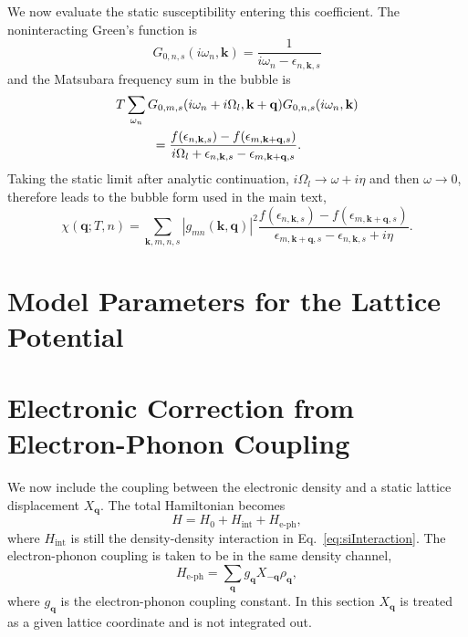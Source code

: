 \documentclass[aps,prx,article,twocolumn,amsmath,amssymb,superscriptaddress,longbibliography]{revtex4-2}
\begin{document}
We now evaluate the static susceptibility entering this coefficient.
The noninteracting Green's function is
\begin{equation}
G_{0,n,s}(i\omega_n,\mathbf k)
=
\frac{1}{i\omega_n-\epsilon_{n,\mathbf k,s}}
\end{equation}
and the Matsubara frequency sum in the bubble is
\begin{align}
&T
\sum_{\omega_n}
G_{0,m,s}(i\omega_n+i\Omega_l,\mathbf k+\mathbf q)
G_{0,n,s}(i\omega_n,\mathbf k)
\nonumber\\
&\hspace{1.0cm}
=
\frac{
f(\epsilon_{n,\mathbf k,s})
-
f(\epsilon_{m,\mathbf k+\mathbf q,s})
}{
i\Omega_l
+
\epsilon_{n,\mathbf k,s}
-
\epsilon_{m,\mathbf k+\mathbf q,s}
}.
\end{align}
Taking the static limit after analytic continuation,
$i\Omega_l\rightarrow \omega+i\eta$ and then $\omega\rightarrow 0$,
therefore leads to the bubble form used in the main text,
\begin{equation}
\chi(\mathbf q;T,n)
=
\sum_{\mathbf k,m,n,s}
\left|
g_{mn}(\mathbf k,\mathbf q)
\right|^2
\frac{
f(\epsilon_{n,\mathbf k,s})
-
f(\epsilon_{m,\mathbf k+\mathbf q,s})
}{
\epsilon_{m,\mathbf k+\mathbf q,s}
-
\epsilon_{n,\mathbf k,s}
+
i\eta
}.
\end{equation}

\section{Model Parameters for the Lattice Potential}\label{app:latticePotential}


\section{Electronic Correction from Electron-Phonon Coupling}
\label{app:ephElectronicCorrection}

We now include the coupling between the electronic density and a static
lattice displacement $X_{\mathbf q}$.  The total Hamiltonian becomes
\begin{equation}
H
=
H_0
+
H_{\mathrm{int}}
+
H_{\mathrm{e\text{-}ph}},
\end{equation}
where $H_{\mathrm{int}}$ is still the density-density interaction in
Eq.~\eqref{eq:siInteraction}.  The electron-phonon coupling is taken to
be in the same density channel,
\begin{equation}
H_{\mathrm{e\text{-}ph}}
=
\sum_{\mathbf q}
g_{\mathbf q}X_{-\mathbf q}\rho_{\mathbf q},
\end{equation}
where $g_{\mathbf q}$ is the electron-phonon coupling constant.  In this
section $X_{\mathbf q}$ is treated as a given lattice coordinate and is
not integrated out.
\end{document}
